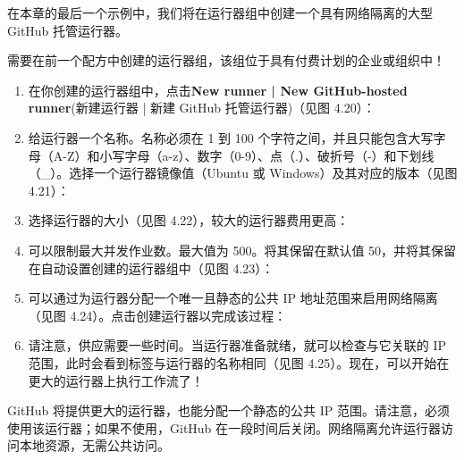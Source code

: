 在本章的最后一个示例中，我们将在运行器组中创建一个具有网络隔离的大型 GitHub 托管运行器。


需要在前一个配方中创建的运行器组，该组位于具有付费计划的企业或组织中！


\begin{enumerate}
\item 
在你创建的运行器组中，点击\textbf{New runner | New GitHub-hosted runner}(新建运行器 | 新建 GitHub 托管运行器)（见图 4.20）：


\item 
给运行器一个名称。名称必须在 1 到 100 个字符之间，并且只能包含大写字母（A-Z）和小写字母（a-z）、数字（0-9）、点（.）、破折号（-）和下划线（\_）。选择一个运行器镜像值（Ubuntu 或 Windows）及其对应的版本（见图 4.21）：


\item 
选择运行器的大小（见图 4.22），较大的运行器费用更高：


\item 
可以限制最大并发作业数。最大值为 500。将其保留在默认值 50，并将其保留在自动设置创建的运行器组中（见图 4.23）：


\item 
可以通过为运行器分配一个唯一且静态的公共 IP 地址范围来启用网络隔离（见图 4.24）。点击创建运行器以完成该过程：


\item 
请注意，供应需要一些时间。当运行器准备就绪，就可以检查与它关联的 IP 范围，此时会看到标签与运行器的名称相同（见图 4.25）。现在，可以开始在更大的运行器上执行工作流了！


\end{enumerate}


GitHub 将提供更大的运行器，也能分配一个静态的公共 IP 范围。请注意，必须使用该运行器；如果不使用，GitHub 在一段时间后关闭。网络隔离允许运行器访问本地资源，无需公共访问。